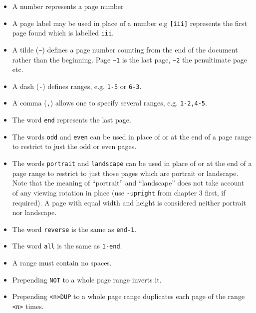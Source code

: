 \documentclass{book}
\begin{document}
  \begin{itemize}
    \item A number represents a page number
    \item A page label may be used in place of a number e.g \texttt{[iii]} represents the first page found which is labelled \texttt{iii}.
    \item A tilde (\texttt{\~{}}) defines a page number counting from the end of the document rather than the beginning. Page \texttt{\~{}1} is the last page, \texttt{\~{}2} the penultimate page etc.
    \item A dash (\texttt{-}) defines ranges, e.g. \texttt{1-5} or \texttt{6-3}.
    \item A comma (\texttt{,}) allows one to specify several ranges, e.g. \texttt{1-2,4-5}.
    \item The word \texttt{end} represents the last page.
    \item The words \texttt{odd} and \texttt{even} can be used in place of or at the end of a page range to restrict to just the odd or even pages.
    \item The words \texttt{portrait} and \texttt{landscape} can be used in place of or at the end of a page range to restrict to just those pages which are portrait or landscape. Note that the meaning of ``portrait'' and ``landscape'' does not take account of any viewing rotation in place (use \texttt{-upright} from chapter 3 first, if required). A page with equal width and height is considered neither portrait nor landscape.
    \item The word \texttt{reverse} is the same as \texttt{end-1}.
    \item The word \texttt{all} is the same as \texttt{1-end}.
    \item A range must contain no spaces.
    \item Prepending \texttt{NOT} to a whole page range inverts it. 
    \item Prepending \verb!<n>!\texttt{DUP} to a whole page range duplicates each page of the range \verb!<n>! times.
  \end{itemize}
 
\end{document}
